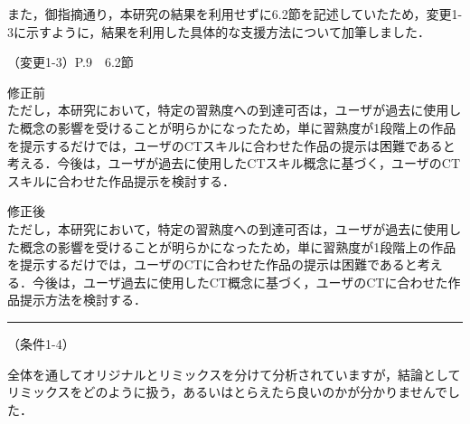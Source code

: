 \documentclass{jarticle} %
\def\subsection#1{ \vspace{1pc} {\gt #1} }
\def\nextans{ \vspace{2pc} \hrule }
\begin{document}
また，御指摘通り，本研究の結果を利用せずに6.2節を記述していたため，変更1-3に示すように，結果を利用した具体的な支援方法について加筆しました．


\subsection{（変更1-3）P.9　6.2節}
\vspace{-0.3cm}
\begin{description}
\item 修正前\\
\phantom{　}
ただし，本研究において，特定の習熟度への到達可否は，ユーザが過去に使用した概念の影響を受けることが明らかになったため，単に習熟度が1段階上の作品を提示するだけでは，ユーザのCTスキルに合わせた作品の提示は困難であると考える．今後は，ユーザが過去に使用したCTスキル概念に基づく，ユーザのCTスキルに合わせた作品提示を検討する．
\vspace{-0.3cm}
\item 修正後\\
\phantom{　}
ただし，本研究において，特定の習熟度への到達可否は，ユーザが過去に使用した概念の影響を受けることが明らかになったため，単に習熟度が1段階上の作品を提示するだけでは，ユーザのCTに合わせた作品の提示は困難であると考える．\textcolor{red}{}今後は，ユーザ過去に使用したCT概念に基づく，ユーザのCTに合わせた作品提示方法を検討する．

\end{description}


\newpage
\nextans
\subsection{（条件1-4）}

全体を通してオリジナルとリミックスを分けて分析されていますが，結論としてリミックスをどのように扱う，あるいはとらえたら良いのかが分かりませんでした．
\end{document}
